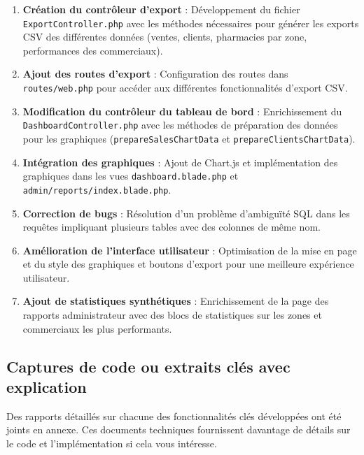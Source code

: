 \documentclass[a4paper,12pt]{report}
\begin{document}
  \begin{enumerate}
    \item \textbf{Création du contrôleur d'export} : Développement du fichier \texttt{ExportController.php} avec les méthodes nécessaires pour générer les exports CSV des différentes données (ventes, clients, pharmacies par zone, performances des commerciaux).
    
    \item \textbf{Ajout des routes d'export} : Configuration des routes dans \texttt{routes/web.php} pour accéder aux différentes fonctionnalités d'export CSV.
    
    \item \textbf{Modification du contrôleur du tableau de bord} : Enrichissement du \texttt{DashboardController.php} avec les méthodes de préparation des données pour les graphiques (\texttt{prepareSalesChartData} et \texttt{prepareClientsChartData}).
    
    \item \textbf{Intégration des graphiques} : Ajout de Chart.js et implémentation des graphiques dans les vues \texttt{dashboard.blade.php} et \texttt{admin/reports/index.blade.php}.
    
    \item \textbf{Correction de bugs} : Résolution d'un problème d'ambiguïté SQL dans les requêtes impliquant plusieurs tables avec des colonnes de même nom.
    
    \item \textbf{Amélioration de l'interface utilisateur} : Optimisation de la mise en page et du style des graphiques et boutons d'export pour une meilleure expérience utilisateur.
    
    \item \textbf{Ajout de statistiques synthétiques} : Enrichissement de la page des rapports administrateur avec des blocs de statistiques sur les zones et commerciaux les plus performants.
  \end{enumerate}

  \subsection{Captures de code ou extraits clés avec explication}

    \begin{tcolorbox}[colback=lightgray,colframe=naturacorpgreen,title=\textbf{Information complémentaire},fonttitle=\bfseries,coltitle=white]
    Des rapports détaillés sur chacune des fonctionnalités clés développées ont été joints en annexe. Ces documents techniques fournissent davantage de détails sur le code et l'implémentation si cela vous intéresse.
  \end{tcolorbox}
  
\end{document}
